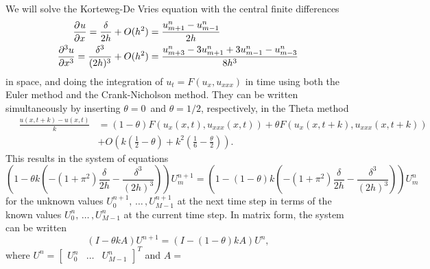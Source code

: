 We will solve the Korteweg-De Vries equation with the central finite differences
\begin{equation*}
\begin{split}
	\dpd{u}{x}    = \frac{\delta}{2h}       + O(h^2) &= \frac{u_{m+1}^n-u_{m-1}^n}{2h}  \\
	\dpd[3]{u}{x} = \frac{\delta^3}{(2h)^3} + O(h^2) &= \frac{u_{m+3}^n-3u_{m+1}^n+3u_{m-1}^n-u_{m-3}^n}{8h^3}
\end{split}
\end{equation*}
in space, and doing the integration of $u_t = F(u_x, u_{xxx})$ in time using both the Euler method and the Crank-Nicholson method.
They can be written simultaneously by inserting $\theta = 0$ and $\theta = 1/2$, respectively, in the Theta method
\begin{equation*}
\begin{split}
\quad \frac{u(x,t+k)-u(x,t)}{k} &= (1-\theta) F\left(u_x(x, t),u_{xxx}(x,t)\right) + \theta F\left(u_x(x, t+k),u_{xxx}(x,t+k)\right)  \\
											&+ O \left( k \left(\frac{1}{2}-\theta\right) + k^2 \left( \frac{1}{6} - \frac{\theta}{2} \right) \right).
\end{split}
\end{equation*}
This results in the system of equations
\begin{equation*}
	\left(1-\theta k \left(-\left(1+\pi^2\right)\frac{\delta}{2h} - \frac{\delta^3}{(2h)^3}\right)\right) U_m^{n+1}
	= \left(1-\left(1-\theta\right) k \left(-\left(1+\pi^2\right)\frac{\delta}{2h} - \frac{\delta^3}{(2h)^3}\right)\right) U_m^n
\end{equation*}
for the unknown values $U_0^{n+1}, \,\dots\,, U_{M-1}^{n+1}$ at the next time step in terms of the known values $U_0^{n}, \,\dots\,, U_{M-1}^{n}$ at the current time step.
In matrix form, the system can be written
\begin{equation}
	\left(I - \theta k A\right) U^{n+1} = \left(I - \left(1-\theta\right) k A\right) U^n,
	\label{matrixeq}
\end{equation}
where $U^{n} = \begin{bmatrix} U_0^n & \dots & U_{M-1}^n \end{bmatrix}^T$ and $A = $
\newcommand\ca{\color{red}}
\newcommand\cb{\color{magenta}}
\newcommand\cc{\color{blue}}
\newcommand\cd{\color{cyan}}
